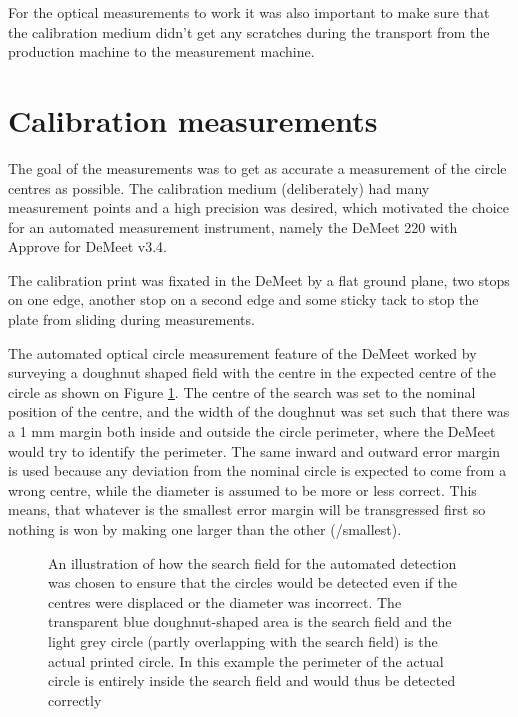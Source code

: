 For the optical measurements to work it was also important to make sure that the calibration medium didn't get any scratches during the transport from the production machine to the measurement machine.

\section{Calibration measurements}\label{sec:cal-meas}

The goal of the measurements was to get as accurate a measurement of the circle centres as possible. The calibration medium (deliberately) had many measurement points and a high precision was desired, which motivated the choice for an automated measurement instrument, namely the DeMeet 220 with Approve for DeMeet v3.4.

The calibration print was fixated in the DeMeet by a flat ground plane, two stops on one edge, another stop on a second edge and some sticky tack to stop the plate from sliding during measurements.

The automated optical circle measurement feature of the DeMeet worked by surveying a doughnut shaped field with the centre in the expected centre of the circle as shown on Figure \ref{fig:doughnut}. The centre of the search was set to the nominal position of the centre, and the width of the doughnut was set such that there was a 1 mm margin both inside and outside the circle perimeter, where the DeMeet would try to identify the perimeter. The same inward and outward error margin is used because any deviation from the nominal circle is expected to come from a wrong centre, while the diameter is assumed to be more or less correct. This means, that whatever is the smallest error margin will be transgressed first so nothing is won by making one larger than the other (/smallest).

\begin{figure}
    \centering
    
    \caption{An illustration of how the search field for the automated detection was chosen to ensure that the circles would be detected even if the centres were displaced or the diameter was incorrect. The transparent blue doughnut-shaped area is the search field and the light grey circle (partly overlapping with the search field) is the actual printed circle. In this example the perimeter of the actual circle is entirely inside the search field and would thus be detected correctly}
    \label{fig:doughnut}
\end{figure}

